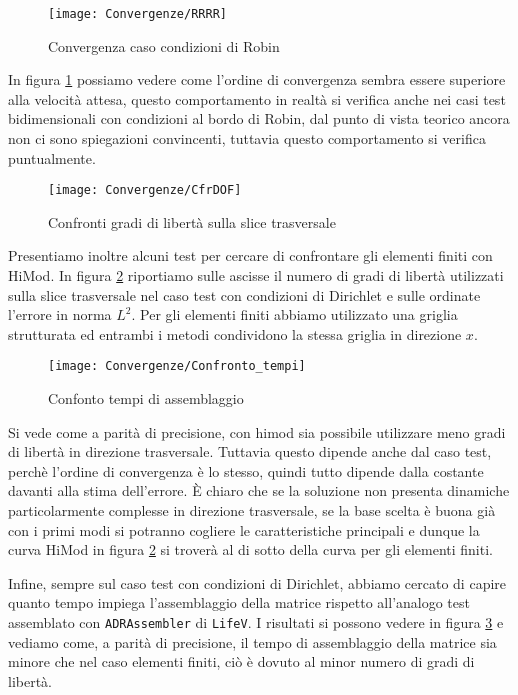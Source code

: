 \begin{figure}[!h]
\centering
\texttt{[image: Convergenze/RRRR]}
\caption{Convergenza caso condizioni di Robin}
\label{fig:rrrr_conv}
\end{figure}

In figura \ref{fig:rrrr_conv} possiamo 
vedere come l'ordine di convergenza sembra essere superiore alla velocit\`a attesa, questo comportamento in realt\`a 
si verifica anche nei casi test bidimensionali con condizioni al bordo di Robin, dal punto di vista teorico ancora non ci sono 
spiegazioni convincenti, tuttavia questo comportamento si verifica puntualmente.

\begin{figure}[!b]
\centering
\texttt{[image: Convergenze/CfrDOF]}
\caption{Confronti gradi di libert\`a sulla slice trasversale}
\label{fig:dof}
\end{figure}

Presentiamo inoltre alcuni test per cercare di confrontare gli elementi finiti con HiMod.
In figura \ref{fig:dof} riportiamo sulle ascisse il numero di gradi di libert\`a utilizzati sulla slice trasversale nel caso test con condizioni di Dirichlet e sulle ordinate l'errore in norma $L^2$.
Per gli elementi finiti abbiamo utilizzato una griglia strutturata ed entrambi i metodi condividono la stessa griglia 
in direzione $x$.

\begin{figure}[!b]
\centering
\texttt{[image: Convergenze/Confronto\_tempi]}
\caption{Confonto tempi di assemblaggio}
\label{fig:time}
\end{figure}

Si vede come a parit\`a di precisione, con himod sia possibile utilizzare meno gradi di libert\`a in direzione trasversale.
Tuttavia questo dipende anche dal caso test, perch\`e l'ordine di convergenza \`e lo stesso, quindi tutto dipende dalla 
costante davanti alla stima dell'errore. \`E chiaro che se la soluzione non presenta dinamiche particolarmente complesse in direzione trasversale,
se la base scelta \`e buona gi\`a con i primi modi si potranno cogliere le caratteristiche principali e dunque la curva HiMod
in figura \ref{fig:dof} si trover\`a al di sotto della curva per gli elementi finiti.

Infine, sempre sul caso test con condizioni di Dirichlet, abbiamo cercato di capire quanto tempo impiega l'assemblaggio della matrice
rispetto all'analogo test assemblato con \texttt{ADRAssembler} di \texttt{LifeV}.
I risultati si possono vedere in figura \ref{fig:time} e vediamo come, a parit\`a di precisione, il tempo di assemblaggio 
della matrice sia minore che nel caso elementi finiti, ci\`o \`e dovuto al minor numero di gradi di libert\`a.
